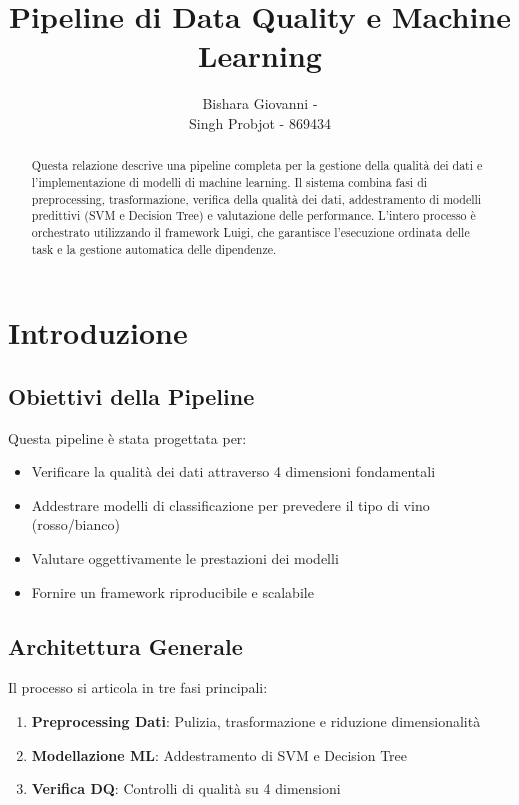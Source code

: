 \documentclass[a4paper, 12pt]{article}
\title{\textbf{Pipeline di Data Quality e Machine Learning}}
\author{
    Bishara Giovanni -  \\
    Singh Probjot - 869434
}
\begin{document}
\maketitle

\begin{abstract}
Questa relazione descrive una pipeline completa per la gestione della qualità dei dati e l'implementazione di modelli di machine learning.
Il sistema combina fasi di preprocessing, trasformazione, verifica della qualità dei dati, addestramento di modelli predittivi (SVM e Decision Tree)
e valutazione delle performance. L'intero processo è orchestrato utilizzando il framework Luigi, che garantisce l'esecuzione ordinata delle task
e la gestione automatica delle dipendenze.
\end{abstract}

\tableofcontents

\section{Introduzione}
\subsection{Obiettivi della Pipeline}
Questa pipeline è stata progettata per:
\begin{itemize}
    \item Verificare la qualità dei dati attraverso 4 dimensioni fondamentali
    \item Addestrare modelli di classificazione per prevedere il tipo di vino (rosso/bianco)
    \item Valutare oggettivamente le prestazioni dei modelli
    \item Fornire un framework riproducibile e scalabile
\end{itemize}

\subsection{Architettura Generale}
Il processo si articola in tre fasi principali:
\begin{enumerate}
    \item \textbf{Preprocessing Dati}: Pulizia, trasformazione e riduzione dimensionalità
    \item \textbf{Modellazione ML}: Addestramento di SVM e Decision Tree
    \item \textbf{Verifica DQ}: Controlli di qualità su 4 dimensioni
\end{enumerate}
\end{document}
